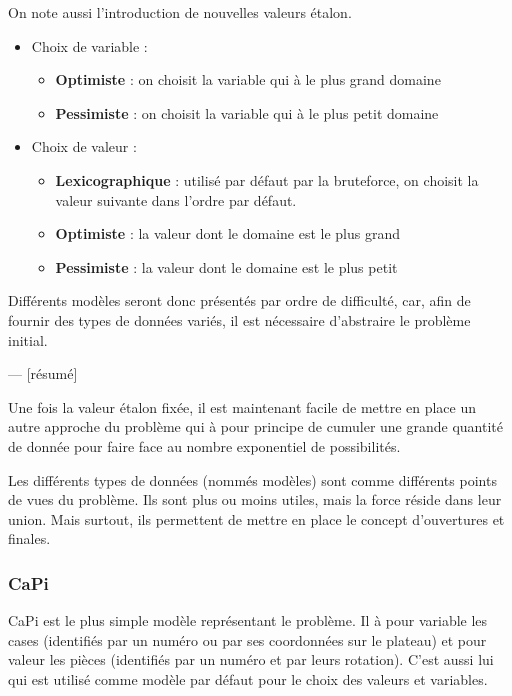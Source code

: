 	On note aussi l'introduction de nouvelles valeurs étalon.
	
	\begin{itemize}
		\item Choix de variable :
		\begin{itemize}
			\item\textbf{Optimiste} : on choisit la variable qui à le plus grand domaine
			\item\textbf{Pessimiste} : on choisit la variable qui à le plus petit domaine
		\end{itemize}
		\item Choix de valeur :
		\begin{itemize}
			\item \textbf{Lexicographique} : utilisé par défaut par la bruteforce, on choisit la valeur suivante dans l'ordre par défaut.
			\item \textbf{Optimiste} : la valeur dont le domaine est le plus grand
			\item \textbf{Pessimiste} : la valeur dont le domaine est le plus petit
		\end{itemize}
	\end{itemize}
	
	Différents modèles seront donc présentés par ordre de difficulté, car, afin de fournir des types de données variés, il est nécessaire d'abstraire le problème initial.
	
--- [résumé]

	Une fois la valeur étalon fixée, il est maintenant facile de mettre en place un autre approche du problème qui à pour principe de cumuler une grande quantité de donnée pour faire face au nombre exponentiel de possibilités.

	Les différents types de données (nommés modèles) sont comme différents points de vues du problème. Ils sont plus ou moins utiles, mais la force réside dans leur union. Mais surtout, ils permettent de mettre en place le concept d'ouvertures et finales.

	\subsubsection{CaPi}

	CaPi est le plus simple modèle représentant le problème. Il à pour variable les cases (identifiés par un numéro ou par ses coordonnées sur le plateau) et pour valeur les pièces (identifiés par un numéro et par leurs rotation). C'est aussi lui qui est utilisé comme modèle par défaut pour le choix des valeurs et variables.
	
